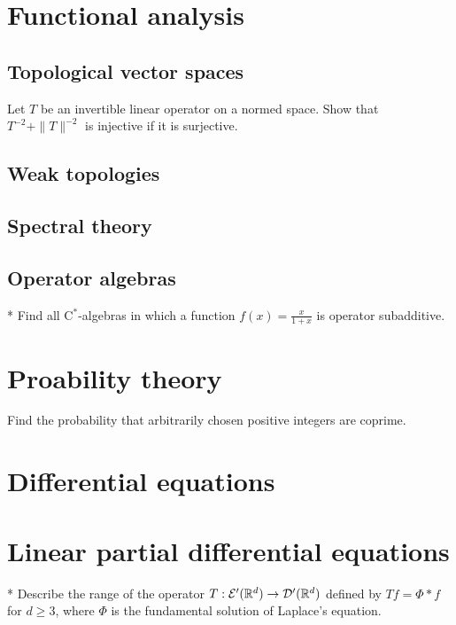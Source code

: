 \documentclass[12pt]{article}
\begin{document}
\section{Functional analysis}
	\subsection{Topological vector spaces}
	\begin{prb}
	Let $T$ be an invertible linear operator on a normed space.
	Show that $T^{-2}+\|T\|^{-2}$ is injective if it is surjective.
	\end{prb}

	\subsection{Weak topologies}
	\subsection{Spectral theory}
	\subsection{Operator algebras}
	\begin{prb}*
	Find all C$^*$-algebras in which a function $f(x)=\frac x{1+x}$ is operator subadditive.
	\end{prb}

\section{Proability theory}

	\begin{prb}
	Find the probability that arbitrarily chosen positive integers are coprime.
	\end{prb}


\section{Differential equations}

\section{Linear partial differential equations}


	\begin{prb}*
	Describe the range of the operator $T:\mathcal{E}'(\mathbb{R}^d)\to\mathcal{D}'(\mathbb{R}^d)$ defined by $Tf=\Phi*f$ for $d\ge3$, where $\Phi$ is the fundamental solution of Laplace's equation.
	\end{prb}
\end{document}
